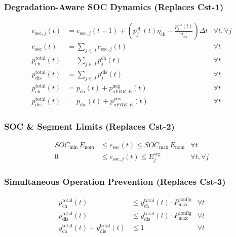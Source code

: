 \documentclass[11pt, a4paper]{article}
\begin{document}
\subsubsection{Degradation-Aware SOC Dynamics (Replaces Cst-1)}
\begin{align}
e_{\mathrm{soc},j}(t) &= e_{\mathrm{soc},j}(t-1) + \left( p^{\mathrm{ch}}_{j}(t) \eta_{\mathrm{ch}} - \frac{p^{\mathrm{dis}}_{j}(t)}{\eta_{\mathrm{dis}}} \right) \Delta t & \forall t, \forall j \\
e_{\mathrm{soc}}(t) &= \sum_{j \in J} e_{\mathrm{soc},j}(t) & \forall t \\
p^{\mathrm{total}}_{\mathrm{ch}}(t) &= \sum_{j \in J} p^{\mathrm{ch}}_{j}(t) & \forall t \\
p^{\mathrm{total}}_{\mathrm{dis}}(t) &= \sum_{j \in J} p^{\mathrm{dis}}_{j}(t) & \forall t \\
p^{\mathrm{total}}_{\mathrm{ch}}(t) &= p_{\mathrm{ch}}(t) + p^{\mathrm{neg}}_{aFRR,E}(t) & \forall t \\
p^{\mathrm{total}}_{\mathrm{dis}}(t) &= p_{\mathrm{dis}}(t) + p^{\mathrm{pos}}_{aFRR,E}(t) & \forall t
\end{align}

\subsubsection{SOC \& Segment Limits (Replaces Cst-2)}
\begin{align}
SOC_{\min}\,E_{\mathrm{nom}} &\le e_{\mathrm{soc}}(t) \le SOC_{\max}\,E_{\mathrm{nom}} & \forall t \\
0 &\le e_{\mathrm{soc},j}(t) \le E^{\mathrm{seg}}_{j} & \forall t, \forall j
\end{align}

\subsubsection{Simultaneous Operation Prevention (Replaces Cst-3)}
\begin{align}
p^{\mathrm{total}}_{\mathrm{ch}}(t) &\le y^{\mathrm{total}}_{\mathrm{ch}}(t) \cdot P^{\mathrm{config}}_{\max} & \forall t \\
p^{\mathrm{total}}_{\mathrm{dis}}(t) &\le y^{\mathrm{total}}_{\mathrm{dis}}(t) \cdot P^{\mathrm{config}}_{\max} & \forall t \\
y^{\mathrm{total}}_{\mathrm{ch}}(t) + y^{\mathrm{total}}_{\mathrm{dis}}(t) &\le 1 & \forall t
\end{align}
\end{document}
